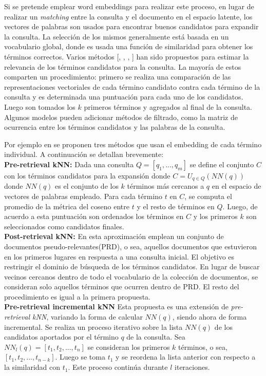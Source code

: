 \documentclass{llncs}
\begin{document}
Si se pretende emplear word embeddings para realizar este proceso, en lugar de realizar un \textit{matching} entre la consulta y el documento en el espacio latente, los vectores de palabras son usados para encontrar buenos candidatos para expandir la consulta. La selección de los mismos generalmente está basada en un vocabulario global, donde es usada una función de similaridad para obtener los términos correctos. Varios métodos [\cite{160}, \cite{190}, \cite{191}, \cite{165}] han sido propuestos para estimar la relevancia de los términos candidatos para la consulta. La mayoría de estos comparten un procedimiento: primero se realiza una comparación de las representaciones vectoriales de cada término candidato contra cada término de la consulta y es determinada una puntuación para cada uno de los candidatos. Luego son tomados los $k$ primeros términos y agregados al final de la consulta. Algunos modelos \cite{192} pueden adicionar métodos de filtrado, como la matriz de ocurrencia entre los términos candidatos y las palabras de la consulta. 

Por ejemplo en \cite{190} se proponen tres métodos que usan el embedding de cada término individual. A continuación se detallan brevemente:
\\

\textbf{Pre-retrieval kNN: } Dada una consulta $Q = [q_1, ..., q_m]$ se define el conjunto $C$ con los términos candidatos para la expansión donde $C = U_{q \in Q}(NN(q)) $ donde $NN(q)$ es el conjunto de los $k$ términos más cercanos a $q$ en el espacio de vectores de palabras empleado. Para cada término $t$ en $C$, se computa el promedio de la métrica del coseno entre $t$ y el resto de términos en $Q$. Luego, de acuerdo a esta puntuación son ordenados los términos en $C$ y los primeros $k$ son seleccionados como candidatos finales.
\\

\textbf{Post-retrieval kNN: } En esta aproximación emplean un conjunto de documentos pseudo-relevantes(PRD), o sea, aquellos documentos que estuvieron en los primeros lugares en respuesta a una consulta inicial. El objetivo es restringir el dominio de búsqueda de los términos candidatos. En lugar de buscar vecinos cercanos dentro de todo el vocabulario de la colección de documentos, se consideran solo aquellos términos que ocurren dentro de PRD. El resto del procedimiento es igual a la primera propuesta.
\\

\textbf{Pre-retrieval incremental kNN}
Esta propuesta es una extensión de \textit{pre-retrieval kNN}, variando la forma de calcular $NN(q)$, siendo ahora de forma incremental. Se realiza un proceso iterativo sobre la lista $NN(q)$ de los candidatos aportados por el término $q$ de la consulta. Sea $NN_l(q) = [t_1, t_2, ..., t_n]$ se consideran los primeros $k$ términos, o sea, $[t_1, t_2, ..., t_{n-k}]$. Luego se toma $t_1$ y se reordena la lista anterior con respecto a la similaridad con $t_1$. Este proceso continúa durante $l$ iteraciones.
\end{document}
